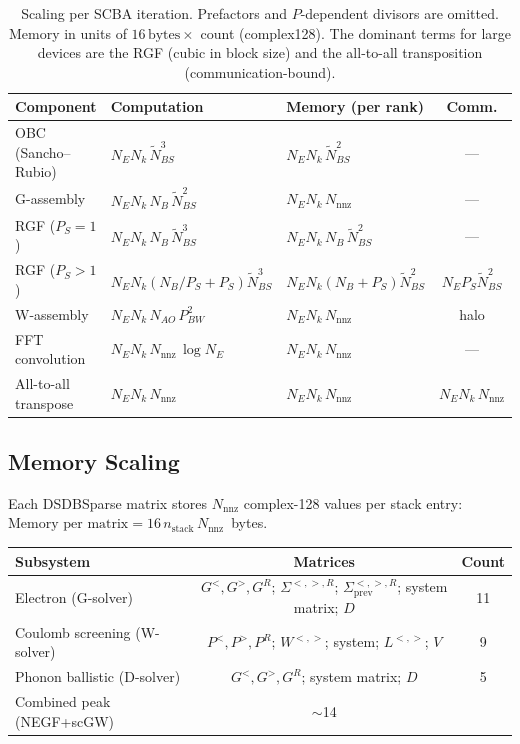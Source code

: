 \begin{table}[htb]
\centering
\footnotesize
\begin{tabular}{lllc}
  \toprule
  Component & Computation & Memory (per rank) & Comm. \\
  \midrule
  OBC (Sancho--Rubio) &
    $N_E N_k\,\widetilde{N}_{BS}^3$ &
    $N_E N_k\,\widetilde{N}_{BS}^2$ & --- \\
  G-assembly &
    $N_E N_k\,N_B\,\widetilde{N}_{BS}^2$ &
    $N_E N_k\,N_\mathrm{nnz}$ & --- \\
  RGF ($P_S=1$) &
    $N_E N_k\,N_B\,\widetilde{N}_{BS}^3$ &
    $N_E N_k\,N_B\,\widetilde{N}_{BS}^2$ & --- \\
  RGF ($P_S>1$) &
    $N_E N_k(N_B/P_S+P_S)\widetilde{N}_{BS}^3$ &
    $N_E N_k(N_B+P_S)\widetilde{N}_{BS}^2$ &
    $N_E P_S\widetilde{N}_{BS}^2$ \\
  W-assembly &
    $N_E N_k\,N_{AO}\,P_{BW}^2$ &
    $N_E N_k\,N_\mathrm{nnz}$ & halo \\
  FFT convolution &
    $N_E N_k\,N_\mathrm{nnz}\,\log N_E$ &
    $N_E N_k\,N_\mathrm{nnz}$ & --- \\
  All-to-all transpose &
    $N_E N_k\,N_\mathrm{nnz}$ &
    $N_E N_k\,N_\mathrm{nnz}$ &
    $N_E N_k\,N_\mathrm{nnz}$ \\
  \bottomrule
\end{tabular}
\caption{Scaling per SCBA iteration.  Prefactors and $P$-dependent
  divisors are omitted.  Memory in units of $16\,\text{bytes}\times$
  count (complex128).  The dominant terms for large devices are the
  RGF (cubic in block size) and the all-to-all transposition
  (communication-bound).}
\label{tab:scaling_summary}
\end{table}


\subsection{Memory Scaling}
\label{sec:memory}

Each DSDBSparse matrix stores $N_\mathrm{nnz}$ complex-128 values per
stack entry:
$\text{Memory per matrix} = 16\,n_\mathrm{stack}\,N_\mathrm{nnz}$~bytes.

\begin{center}
\begin{tabular}{lcc}
  \toprule
  Subsystem & Matrices & Count \\
  \midrule
  Electron (G-solver) &
    $G^<,G^>,G^R$; $\Sigma^{<,>,R}$;
    $\Sigma^{<,>,R}_\mathrm{prev}$; system matrix; $D$
    & 11 \\
  Coulomb screening (W-solver) &
    $P^<,P^>,P^R$; $W^{<,>}$; system; $L^{<,>}$; $V$
    & 9 \\
  Phonon ballistic (D-solver) &
    $G^<,G^>,G^R$; system matrix; $D$
    & 5 \\
  Combined peak (NEGF+scGW) & $\sim$14 & \\
  \bottomrule
\end{tabular}
\end{center}

